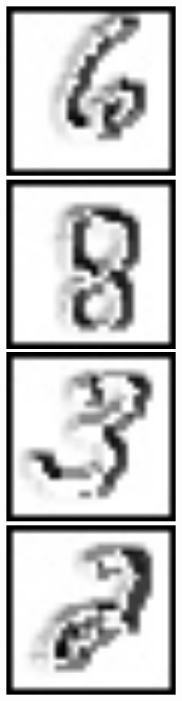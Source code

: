 \documentclass{article}
\begin{document}
\begin{figure}
            \includegraphics[width=0.5\textwidth]{lbp1}
            \includegraphics[width=0.5\textwidth]{lbp2}
            \includegraphics[width=0.5\textwidth]{lbp3}
             \includegraphics[width=0.5\textwidth]{lbp4}

\end{figure}
\end{document}
